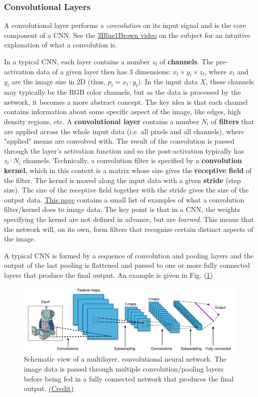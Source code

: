 \documentclass{article}
\begin{document}
\subsubsection*{Convolutional Layers}
A convolutional layer performs a \emph{convolution} on its input signal and is the core component of a CNN. See the \href{https://youtu.be/KuXjwB4LzSA}{3Blue1Brown video} on the subject for an intuitive explanation of what a convolution is.

In a typical CNN, each layer contains a number $z_l$ of \textbf{channels}. The pre-activation data of a given layer then has 3 dimensions: $x_l \times y_l \times z_l$, where $x_l$ and $y_l$ are the image size in 2D (thus, $p_l = x_l\cdot y_l$).
In the input data $X$, these channels may typically be the RGB color channels, but as the data is processed by the network, it becomes a more abstract concept. The key idea is that each channel contains information about some specific aspect of the image, like edges, high density regions, etc.
A \textbf{convolutional layer} contains a number $N_l$ of \textbf{filters} that are applied across the whole input data (i.e. all pixels and all channels), where "applied" means are convolved with. The result of the convolution is passed through the layer's activation function and so the post-activation typically has $z_l \cdot N_l$ channels. Technically, a convolution filter is specified by a \textbf{convolution kernel}, which in this context is a matrix whose size gives the \textbf{receptive field} of the filter. The kernel is moved along the input data with a given \textbf{stride} (step size). The size of the receptive field together with the stride gives the size of the output data. \href{https://en.wikipedia.org/wiki/Kernel\_(image_processing)}{This page} contains a small list of examples of what a convolution filter/kernel does to image data. The key point is that in a CNN, the weights specifying the kernel are not defined in advance, but are \emph{learned}. This means that the network will, on its own, form filters that recognize certain distinct aspects of the image.

A typical CNN is formed by a sequence of convolution and pooling layers and the output of the last pooling is flattened and passed to one or more fully connected layers that produce the final output. An example is given in Fig. (\ref{fig:CNN})
\begin{figure}[h]
    \centering
    \includegraphics[width=0.75\linewidth]{Typical_cnn}
    \caption{Schematic view of a multilayer, convolutional neural network. The image data is passed through multiple convolution/pooling layers before being fed in a fully connected network that produces the final output. \href{https://commons.wikimedia.org/wiki/File:Typical_cnn.png}{(Credit)}}
    \label{fig:CNN}
\end{figure}
\end{document}
